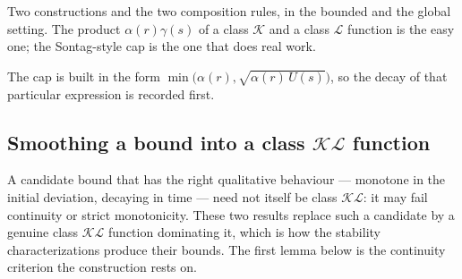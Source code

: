 Two constructions and the two composition rules, in the bounded and the global setting. The
product $\alpha(r)\gamma(s)$ of a class $\mathcal{K}$ and a class $\mathcal{L}$ function is the
easy one; the Sontag-style cap is the one that does real work.


The cap is built in the form $\min\bigl(\alpha(r), \sqrt{\alpha(r)\,U(s)}\bigr)$, so the decay
of that particular expression is recorded first.
















\subsection{Smoothing a bound into a class \texorpdfstring{$\mathcal{KL}$}{KL} function}

A candidate bound that has the right qualitative behaviour — monotone in the initial deviation,
decaying in time — need not itself be class $\mathcal{KL}$: it may fail continuity or strict
monotonicity. These two results replace such a candidate by a genuine class $\mathcal{KL}$
function dominating it, which is how the stability characterizations produce their bounds.
The first lemma below is the continuity criterion the construction rests on.


